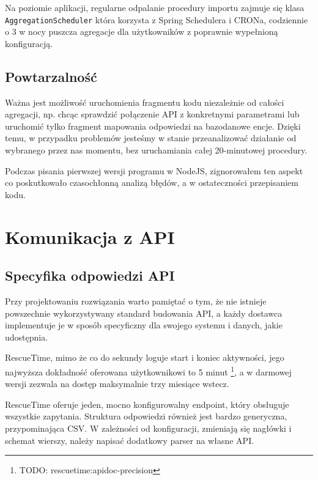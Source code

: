 \documentclass[openright]{xmgr}
\begin{document}
            Na poziomie aplikacji, regularne odpalanie procedury importu zajmuje się klasa \texttt{AggregationScheduler}
            która korzysta z Spring Schedulera i CRONa, codziennie o 3 w nocy puszcza agregacje dla użytkowników z poprawnie wypełnioną konfiguracją.

        \subsection*{Powtarzalność}

            Ważna jest możliwość uruchomienia fragmentu kodu niezależnie od całości agregacji, np. chcąc sprawdzić połączenie API z konkretnymi parametrami
            lub uruchomić tylko fragment mapowania odpowiedzi na bazodanowe encje.
            Dzięki temu, w przypadku problemów jesteśmy w stanie przeanalizować działanie od wybranego przez nas momentu,
            bez uruchamiania całej 20-minutowej procedury.

            Podczas pisania pierwszej wersji programu w NodeJS, zignorowałem ten aspekt co poskutkowało czasochłonną analizą błędów,
            a w ostateczności przepisaniem kodu.


    \section{Komunikacja z API}

        \subsection*{Specyfika odpowiedzi API}
            Przy projektowaniu rozwiązania warto pamiętać o tym, że nie istnieje powszechnie wykorzystywany standard budowania API,
            a każdy dostawca implementuje je w sposób specyficzny dla swojego systemu i danych, jakie udostępnia.

            RescueTime, mimo że co do sekundy loguje start i koniec aktywności,
            jego najwyższa dokładność oferowana użytkownikowi to 5 minut \footnote{TODO: rescuetime:apidoc-precision},
            a w darmowej wersji zezwala na dostęp maksymalnie trzy miesiące wstecz.

            RescueTime oferuje jeden, mocno konfigurowalny endpoint, który obsługuje wszystkie zapytania.
            Struktura odpowiedzi również jest bardzo generyczna, przypominająca CSV.
            W zależności od konfiguracji, zmieniają się nagłówki i schemat wierszy, należy napisać dodatkowy parser na własne API.
\end{document}
